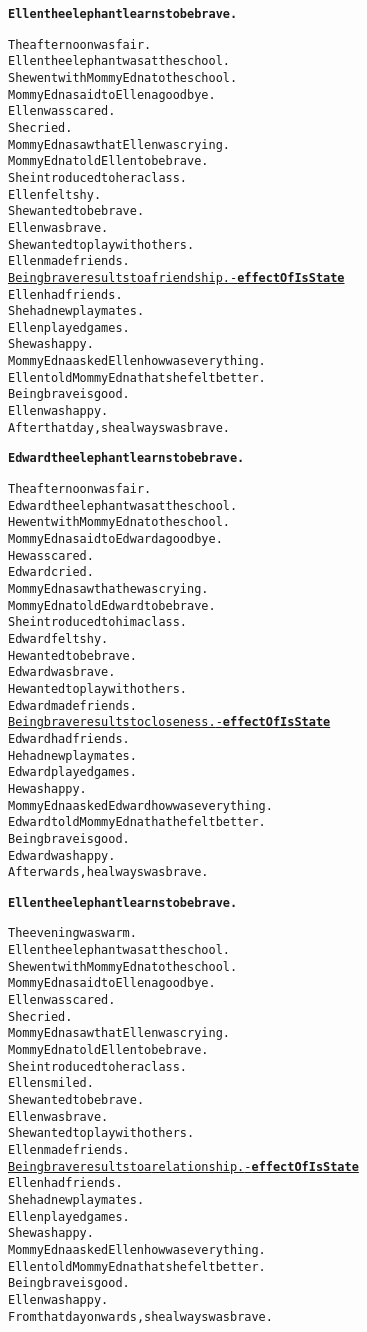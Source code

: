 \begin{alltt}
\textbf{Ellen the elephant learns to be brave.}

The afternoon was fair.
Ellen the elephant was at the school.
She went with Mommy Edna to the school.
Mommy Edna said to Ellen a goodbye.
Ellen was scared.
She cried.
Mommy Edna saw that Ellen was crying.
Mommy Edna told Ellen to be brave.
She introduced to her a class.
Ellen felt shy.
She wanted to be brave.
Ellen was brave.
She wanted to play with others.
Ellen made friends.
\underline{Being brave results to a friendship. - \textbf{effectOfIsState}}
Ellen had friends.
She had new playmates.
Ellen played games.
She was happy.
Mommy Edna asked Ellen how was everything.
Ellen told Mommy Edna that she felt better.
Being brave is good.
Ellen was happy.
After that day, she always was brave.

\textbf{Edward the elephant learns to be brave.}

The afternoon was fair.
Edward the elephant was at the school.
He went with Mommy Edna to the school.
Mommy Edna said to Edward a goodbye.
He was scared.
Edward cried.
Mommy Edna saw that he was crying.
Mommy Edna told Edward to be brave.
She introduced to him a class.
Edward felt shy.
He wanted to be brave.
Edward was brave.
He wanted to play with others.
Edward made friends.
\underline{Being brave results to closeness. - \textbf{effectOfIsState}}
Edward had friends.
He had new playmates.
Edward played games.
He was happy.
Mommy Edna asked Edward how was everything.
Edward told Mommy Edna that he felt better.
Being brave is good.
Edward was happy.
Afterwards, he always was brave.

\textbf{Ellen the elephant learns to be brave.}

The evening was warm.
Ellen the elephant was at the school.
She went with Mommy Edna to the school.
Mommy Edna said to Ellen a goodbye.
Ellen was scared.
She cried.
Mommy Edna saw that Ellen was crying.
Mommy Edna told Ellen to be brave.
She introduced to her a class.
Ellen smiled.
She wanted to be brave.
Ellen was brave.
She wanted to play with others.
Ellen made friends.
\underline{Being brave results to a relationship. - \textbf{effectOfIsState}}
Ellen had friends.
She had new playmates.
Ellen played games.
She was happy.
Mommy Edna asked Ellen how was everything.
Ellen told Mommy Edna that she felt better.
Being brave is good.
Ellen was happy.
From that day onwards, she always was brave.
\end{alltt}

